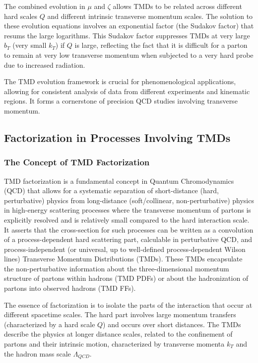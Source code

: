 \documentclass[11pt]{article}
\begin{document}
The combined evolution in $\mu$ and $\zeta$ allows TMDs to be related across different hard scales $Q$ and different intrinsic transverse momentum
scales. The solution to these evolution equations involves an exponential factor (the Sudakov factor) that resums the large logarithms. This Sudakov
factor suppresses TMDs at very large $b_T$ (very small $k_T$) if $Q$ is large, reflecting the fact that it is difficult for a parton to remain at
very low transverse momentum when subjected to a very hard probe due to increased radiation.

The TMD evolution framework is crucial for phenomenological applications, allowing for consistent analysis of data from different experiments and
kinematic regions. It forms a cornerstone of precision QCD studies involving transverse momentum.

\subsection{Factorization in Processes Involving TMDs}

\subsubsection{The Concept of TMD Factorization}

TMD factorization is a fundamental concept in Quantum Chromodynamics (QCD) that allows for a systematic separation of short-distance (hard,
perturbative) physics from long-distance (soft/collinear, non-perturbative) physics in high-energy scattering processes where the transverse momentum
of partons is explicitly resolved and is relatively small compared to the hard interaction scale. It asserts that the cross-section for such
processes can be written as a convolution of a process-dependent hard scattering part, calculable in perturbative QCD, and process-independent (or
universal, up to well-defined process-dependent Wilson lines) Transverse Momentum Distributions (TMDs). These TMDs encapsulate the non-perturbative
information about the three-dimensional momentum structure of partons within hadrons (TMD PDFs) or about the hadronization of partons into observed
hadrons (TMD FFs).

The essence of factorization is to isolate the parts of the interaction that occur at different spacetime scales. The hard part involves large
momentum transfers (characterized by a hard scale $Q$) and occurs over short distances. The TMDs describe the physics at longer distance scales,
related to the confinement of partons and their intrinsic motion, characterized by transverse momenta $k_T$ and the hadron mass scale
$\Lambda_{QCD}$.
\end{document}
